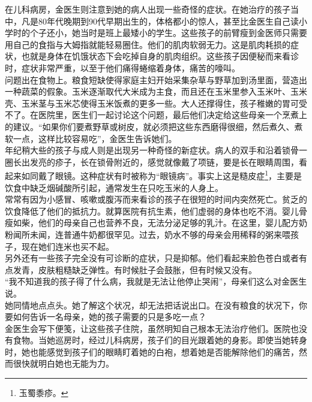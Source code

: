 在儿科病房，金医生则注意到她的病人出现一些奇怪的症状。在她治疗的孩子当中，凡是80年代晚期到90代早期出生的，体格都小的惊人，甚至比金医生自己读小学时的个子还小，她当时是班上最矮小的学生。这些孩子的前臂瘦到金医师只需要用自己的食指与大姆指就能轻易圈住。他们的肌肉软弱无力。这是肌肉耗损的症状，也就是身体在饥饿状态下会吃掉自身的肌肉组织。这些孩子因便秘而来看诊时，症状非常严重，以至于他们痛得蜷缩着身体，痛苦的嚎叫。\\

问题出在食物上。粮食短缺使得家庭主妇开始采集杂草与野草加到汤里面，营造出一种蔬菜的假象。玉米逐渐取代大米成为主食，而且还在玉米里参入玉米叶、玉米壳、玉米茎与玉米芯使得玉米饭煮的更多一些。大人还撑得住，孩子稚嫩的胃可受不了。在医院里，医生们一起讨论这个问题，最后他们决定给这些母亲一个烹煮上的建议。“如果你们要煮野草或树皮，就必须把这些东西磨得很细，然后煮久、煮软一点，这样比较容易吃”，金医生告诉她们。\\

年纪稍大些的孩子与成人则是出现另一种奇怪的新症状。病人的双手和沿着锁骨一圈长出发亮的疹子，长在锁骨附近的，感觉就像戴了项链，要是长在眼睛周围，看起来如同戴了眼镜。这种症状有时被称为“眼镜病”。事实上这是糙皮症\footnote{玉蜀黍疹。}，主要是饮食中缺乏烟碱酸所引起，通常发生在只吃玉米的人身上。\\

常常有因为小感冒、咳嗽或腹泻而来看诊的孩子在很短的时间内突然死亡。贫乏的饮食降低了他们的抵抗力。就算医院有抗生素，他们虚弱的身体也吃不消。婴儿骨瘦如柴，他们的母亲自己也营养不良，无法分泌足够的乳汁。在这里，婴儿配方奶粉闻所未闻，连普通牛奶都很罕见。过去，奶水不够的母亲会用稀释的粥来喂孩子，现在她们连米也买不起。\\

另外还有一些孩子完全没有可诊断的症状，只是抑郁。他们看起来脸色苍白或者有点发青，皮肤粗糙缺乏弹性。有时候肚子会鼓胀，但有时候又没有。\\

“我不知道我的孩子得了什么病，我就是无法让他停止哭闹”，母亲们这么对金医生说。\\

她同情地点点头。她了解这个状况，却无法把话说出口。在没有粮食的状况下，你要如何告诉一名母亲，她的孩子需要的只是多吃一点？\\

金医生会写下便笺，让这些孩子住院，虽然明知自己根本无法治疗他们。医院也没有食物。当她巡房时，经过儿科病房，孩子们的目光跟着她的身影。即使当她转身时，她也能感觉到孩子们的眼睛盯着她的白袍，想着她是否能解除他们的痛苦，然而很快就明白她也无能为力。\\

